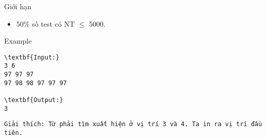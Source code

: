 Giới hạn
\begin{itemize}
	\item 50\% số test có NT  $\le$  5000.
\end{itemize}
Example
\begin{verbatim}
\textbf{Input:}
3 6
97 97 97
97 98 98 97 97 97

\textbf{Output:}
3\end{verbatim}
\begin{verbatim}
Giải thích: Từ phải tìm xuất hiện ở vị trí 3 và 4. Ta in ra vị trí đầu tiên.\end{verbatim}